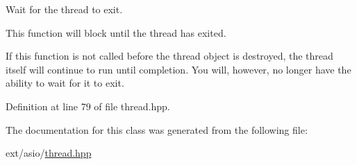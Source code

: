 Wait for the thread to exit. 

This function will block until the thread has exited.

If this function is not called before the thread object is destroyed, the thread itself will continue to run until completion. You will, however, no longer have the ability to wait for it to exit. 

Definition at line 79 of file thread.\+hpp.



The documentation for this class was generated from the following file\+:\begin{DoxyCompactItemize}
\item 
ext/asio/\hyperlink{asio_2thread_8hpp}{thread.\+hpp}\end{DoxyCompactItemize}
